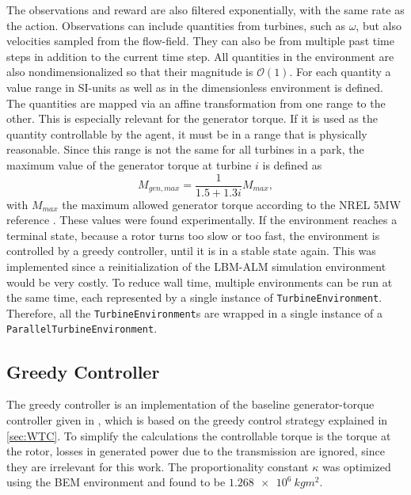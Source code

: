The observations and reward are also filtered exponentially, with the same rate as the action. Observations can include quantities from turbines, such as $\omega$, but also velocities sampled from the flow-field. They can also be from multiple past time steps in addition to the current time step. All quantities in the environment are also nondimensionalized so that their magnitude is $\mathcal{O}(1)$. For each quantity a value range in SI-units as well as in the dimensionless environment is defined. The quantities are mapped via an affine transformation from one range to the other. This is especially relevant for the generator torque. If it is used as the quantity controllable by the agent, it must be in a range that is physically reasonable. Since this range is not the same for all turbines in a park, the maximum value of the generator torque at turbine $i$ is defined as 
\begin{equation}
	M_{gen, max} = \frac{1}{1.5+1.3i} M_{max},
\end{equation} with $M_{max}$ the maximum allowed generator torque according to the NREL 5MW reference \cite{jonkman_definition_2009}. These values were found experimentally.
If the environment reaches a terminal state, because a rotor turns too slow or too fast, the environment is controlled by a greedy controller, until it is in a stable state again. This was implemented since a reinitialization of the LBM-ALM simulation environment would be very costly. To reduce wall time, multiple environments can be run at the same time, each represented by a single instance of \texttt{TurbineEnvironment}. Therefore, all the \texttt{TurbineEnvironment}s are wrapped in a single instance of a \texttt{ParallelTurbineEnvironment}. \\
\subsection{Greedy Controller}
The greedy controller is an implementation of the baseline generator-torque controller given in \cite{jonkman_definition_2009}, which is based on the greedy control strategy explained in \ref{sec:WTC}. To simplify the calculations the controllable torque is the torque at the rotor, losses in generated power due to the transmission are ignored, since they are irrelevant for this work. The proportionality constant $\kappa$ was optimized using the BEM environment and found to be $\SI{1.268e6}{kgm^2}$.
